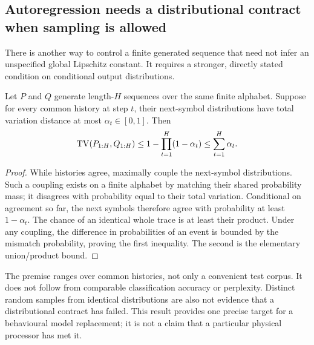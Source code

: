 \subsection{Autoregression needs a distributional contract when sampling is allowed}
There is another way to control a finite generated sequence that need not infer an unspecified global Lipschitz constant. It requires a stronger, directly stated condition on conditional output distributions.
\begin{proposition}\label{prop:tvtrace}
Let $P$ and $Q$ generate length-$H$ sequences over the same finite alphabet. Suppose for every common history at step $t$, their next-symbol distributions have total variation distance at most $\alpha_t\in[0,1]$. Then
\[
 \operatorname{TV}(P_{1:H},Q_{1:H})\leq1-\prod_{t=1}^{H}(1-\alpha_t)
 \leq\sum_{t=1}^{H}\alpha_t.
\]
\end{proposition}
\begin{proof}
While histories agree, maximally couple the next-symbol distributions. Such a coupling exists on a finite alphabet by matching their shared probability mass; it disagrees with probability equal to their total variation. Conditional on agreement so far, the next symbols therefore agree with probability at least $1-\alpha_t$. The chance of an identical whole trace is at least their product. Under any coupling, the difference in probabilities of an event is bounded by the mismatch probability, proving the first inequality. The second is the elementary union/product bound.
\end{proof}
The premise ranges over common histories, not only a convenient test corpus. It does not follow from comparable classification accuracy or perplexity. Distinct random samples from identical distributions are also not evidence that a distributional contract has failed. This result provides one precise target for a behavioural model replacement; it is not a claim that a particular physical processor has met it.
